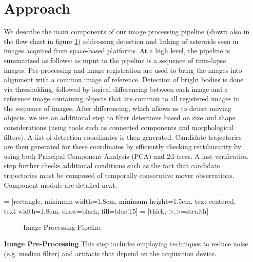 \documentclass{article}
\begin{document}
\section{Approach}
\label{sec:approach}

We describe the main components of our image processing pipeline (shown also in the flow chart in figure \ref{IPP}) addressing detection and linking of asteroids seen in images acquired from space-based platforms.  At a high level, the pipeline is summarized as follows: as input to the pipeline is a sequence of time-lapse images. Pre-processing and image registration are used to bring the images into alignment with a common image of reference.  Detection of bright bodies is done via thresholding, followed by logical differencing between each image and a reference image containing objects that are common to all registered images in the sequence of images.  After differencing, which allows us to detect moving objects, we use an additional step to filter detections based on size and shape considerations (using tools such as connected components and morphological filters).  A list of detection coordinates is then generated.  Candidate trajectories are then generated for these coordinates by efficiently checking rectilinearity by using both Principal Component Analysis (PCA) and 2d-trees.  A last verification step further checks additional conditions such as the fact that candidate trajectories must be composed of temporally consecutive mover observations.  Component module are detailed next. 

 = [rectangle, minimum width=1.8cm, minimum height=1.5cm, text centered, text width=1.8cm, draw=black, fill=blue!15]
 = [thick,->,>=stealth]
\begin{figure}[b]
\vspace{-0.7cm}
\caption{Image Processing Pipeline}
\label{IPP}
\end{figure}

{\bf Image Pre-Processing}
This step includes employing techniques to reduce noise (e.g. median filter) and artifacts that depend on the acquisition device.   %
\end{document}

